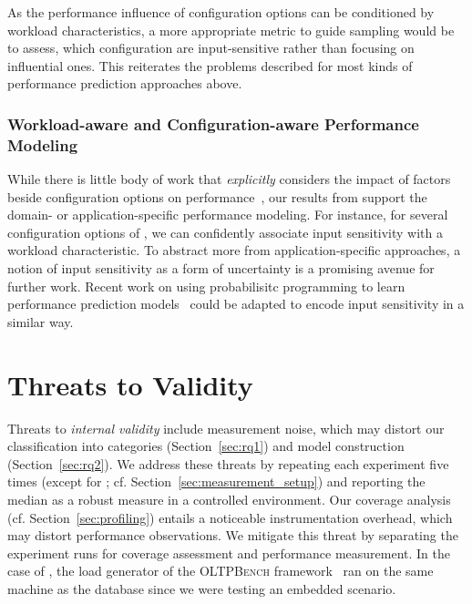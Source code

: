{{\begin{table}
\end{table}

}

As the performance influence of configuration options can be conditioned by workload characteristics, a more appropriate metric to guide sampling would be to assess, which configuration are input-sensitive rather than focusing on influential ones. This reiterates the problems described for most kinds of performance prediction approaches above.

\subsubsection{Workload-aware and Configuration-aware Performance Modeling} While there is little body of work that \textit{explicitly} considers the impact of factors beside configuration options on performance~\cite{koc_satune_2021}, our results from  support the domain- or application-specific performance modeling. For instance, for several configuration options of \jumper, we can confidently associate input sensitivity with a workload characteristic. To abstract more from application-specific approaches, a notion of input sensitivity as a form of uncertainty is a promising avenue for further work. Recent work on using probabilisitc programming to learn performance prediction models~\cite{dorn2020} could be adapted to encode input sensitivity in a similar way.



\section{Threats to Validity}\label{sec:threats}
\color{black}
Threats to \textit{internal validity} include measurement noise, which may distort our classification into categories (Section~\ref{sec:rq1}) and model construction (Section~\ref{sec:rq2}). We address these threats by repeating each experiment five times  (except for \htwo; cf. Section~\ref{sec:measurement_setup}) and reporting the median as a robust measure in a controlled environment. Our coverage analysis (cf. Section~\ref{sec:profiling}) entails a noticeable instrumentation overhead, which may distort performance observations. We mitigate this threat by separating the experiment runs for coverage assessment and performance measurement. In the case of \htwo, the load generator of the \textsc{OLTPBench} framework~\cite{difallah_oltp_2013} ran on the same machine as the database since we were testing an embedded scenario. 	
	
}
